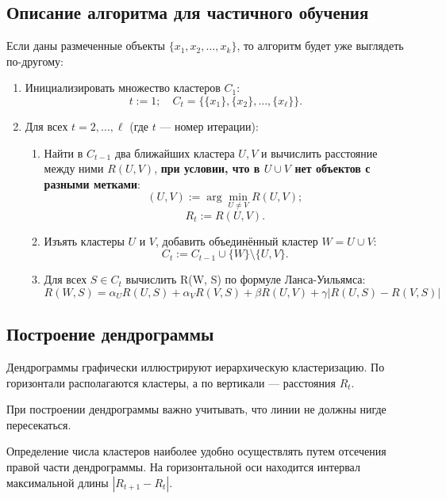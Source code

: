 \subsection{Описание алгоритма для частичного обучения}
Если даны размеченные объекты $\{x_1, x_2, \ldots, x_k\}$, то алгоритм будет уже выглядеть по-другому:
\begin{enumerate}
    \item Инициализировать множество кластеров $C_1$:
          \[
              t := 1; \quad C_t = \{\{x_1\}, \{x_2\}, \ldots, \{x_\ell\}\}.
          \]
    \item Для всех $t = 2, \ldots, \ell$ (где $t$ — номер итерации):
          \begin{enumerate}
              \item Найти в $C_{t-1}$ два ближайших кластера $U, V$ и вычислить расстояние между ними $R(U, V)$, \textbf{при условии, что в $U \cup V$ нет объектов с разными метками}:
                    \[
                        (U, V) := \arg \min_{U \neq V} R(U, V);
                    \]
                    \[
                        R_t := R(U, V).
                    \]
              \item Изъять кластеры $U$ и $V$, добавить объединённый кластер $W = U \cup V$:
                    \[
                        C_t := C_{t-1} \cup \{W\} \setminus \{U, V\}.
                    \]
              \item Для всех $S \in C_t$ вычислить R(W, S) по формуле Ланса-Уильямса:
                    \[
                        R(W, S) = \alpha_U R(U, S) + \alpha_V R(V, S) + \beta R(U, V) + \gamma |R(U, S) - R(V, S)|
                    \]
          \end{enumerate}
\end{enumerate}

\subsection{Построение дендрограммы}
Дендрограммы графически иллюстрируют иерархическую кластеризацию. По горизонтали располагаются кластеры, а по вертикали — расстояния \( R_t \). 

При построении дендрограммы важно учитывать, что линии не должны нигде пересекаться. 

Определение числа кластеров наиболее удобно осуществлять путем отсечения правой части дендрограммы. На горизонтальной оси находится интервал максимальной длины \( |R_{t+1} - R_t| \).

